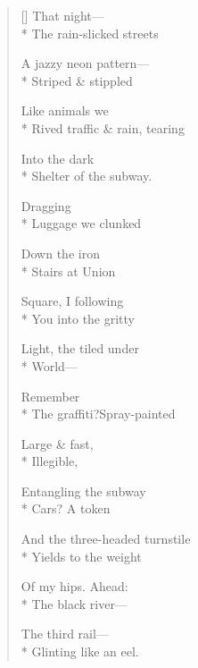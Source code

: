 \label{ch:leaving_new_york}
\begin{verse}[\versewidth]
That night---\\*
The rain-slicked streets

A jazzy neon pattern---\\*
Striped \& stippled

Like animals we\\*
Rived traffic \& rain, tearing

Into the dark\\*
Shelter of the subway.

\hspace*{4\vgap} Dragging\\*
Luggage we clunked

Down the iron\\*
Stairs at Union

Square, I following\\*
You into the gritty

Light, the tiled under\\*
World---

Remember\\*
The graffiti?\qquad Spray-painted

Large \& fast,\\*
Illegible,

Entangling the subway\\*
Cars?   A token

And the three-headed turnstile\\*
Yields to the weight

Of my hips. Ahead:\\*
The black river---

The third rail---\\*
Glinting like an eel.
\end{verse}
